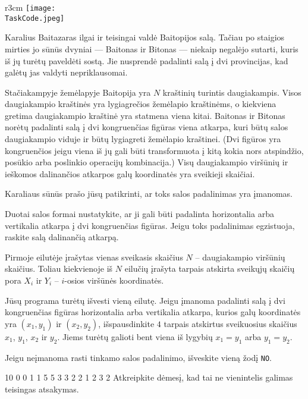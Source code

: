 \documentclass{boi2014-lt}
\renewcommand{\TaskCode}{demarcation}
\newcommand{\constant}[1]{{\tt #1}}
\begin{document}
    \begin{wrapfigure}{r}{3cm}
        \vspace{-24pt}
		\texttt{[image: \\TaskCode.jpeg]}
	\end{wrapfigure}

    Karalius Baitazaras ilgai ir teisingai valdė Baitopijos salą. Tačiau po
    staigios mirties jo sūnūs dvyniai --- Baitonas ir Bitonas --- niekaip
    negalėjo sutarti, kuris iš jų turėtų paveldėti sostą. Jie nusprendė
    padalinti salą į dvi provincijas, kad galėtų jas valdyti nepriklausomai.
 
    Stačiakampyje žemėlapyje Baitopija yra $N$ kraštinių turintis daugiakampis.
    Visos daugiakampio kraštinės yra lygiagrečios žemėlapio kraštinėms, o
    kiekviena gretima daugiakampio kraštinė yra statmena viena kitai. Baitonas ir
    Bitonas norėtų padalinti salą į dvi kongruenčias figūras viena atkarpa, kuri
    būtų salos daugiakampio viduje ir būtų lygiagreti žemėlapio kraštinei. (Dvi
    figūros yra kongruenčios jeigu viena iš jų gali būti transformuota į kitą
    kokia nors atspindžio, posūkio arba poslinkio operacijų kombinacija.) Visų
    daugiakampio viršūnių ir ieškomos dalinančios atkarpos galų koordinatės yra
    sveikieji skaičiai.
 
    Karaliaus sūnūs prašo jūsų patikrinti, ar toks salos padalinimas yra
    įmanomas.

    \Task
    Duotai salos formai nustatykite, ar ji gali būti padalinta horizontalia arba
    vertikalia atkarpa į dvi kongruenčias figūras. Jeigu toks padalinimas
    egzistuoja, raskite salą dalinančią atkarpą.

    \Input
    Pirmoje eilutėje įrašytas vienas sveikasis skaičius $N$ -- daugiakampio
    viršūnių skaičius. Toliau kiekvienoje iš $N$ eilučių įrašyta tarpais atskirta
    sveikųjų skaičių pora $X_i$ ir $Y_i$ -- $i$-osios viršūnės koordinatės.

    \Output
    Jūsų programa turėtų išvesti vieną eilutę. Jeigu įmanoma padalinti salą į dvi
    kongruenčias figūras horizontalia arba vertikalia atkarpa, kurios galų
    koordinatės yra $(x_1, y_1)$ ir $(x_2, y_2)$, išspausdinkite $4$ tarpais
    atskirtus sveikuosius skaičius $x_1$, $y_1$, $x_2$ ir $y_2$. Jiems turėtų
    galioti bent viena iš lygybių $x_1 = y_1$ arba $y_1 = y_2$.

    Jeigu neįmanoma rasti tinkamo salos padalinimo, išveskite vieną žodį
    \constant{NO}.

    \Examples
	\example
	{
		10  0  0  1  1  5  5  3  3  2  2
	}
	{
		1 2 3 2
	}
	{
		Atkreipkite dėmesį, kad tai ne vienintelis galimas teisingas atsakymas.
	}
\end{document}

